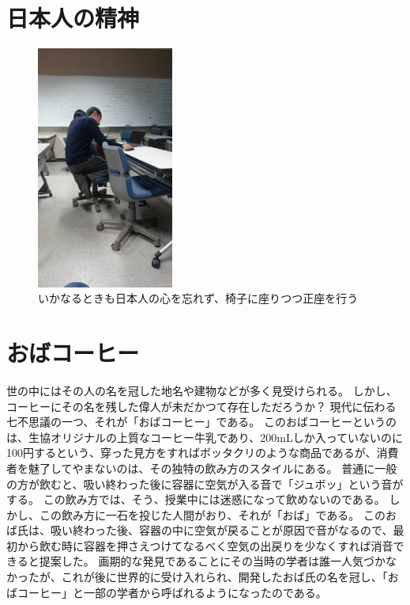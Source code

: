 \section{日本人の精神}

\begin{figure}[h]
\centering
\includegraphics[width=0.4\textwidth]{./section/Shokuji/figures/Seiza.jpg}
  \caption{いかなるときも日本人の心を忘れず、椅子に座りつつ正座を行う}
\label{Fig:Seiza}
\end{figure}



\section{おばコーヒー}
世の中にはその人の名を冠した地名や建物などが多く見受けられる。
しかし、コーヒーにその名を残した偉人が未だかつて存在しただろうか？
現代に伝わる七不思議の一つ、それが「おばコーヒー」である。
このおばコーヒーというのは、生協オリジナルの上質なコーヒー牛乳であり、200mLしか入っていないのに100円するという、穿った見方をすればボッタクリのような商品であるが、消費者を魅了してやまないのは、その独特の飲み方のスタイルにある。
普通に一般の方が飲むと、吸い終わった後に容器に空気が入る音で「ジュボッ」という音がする。
この飲み方では、そう、授業中には迷惑になって飲めないのである。
しかし、この飲み方に一石を投じた人間がおり、それが「おば」である。
このおば氏は、吸い終わった後、容器の中に空気が戻ることが原因で音がなるので、最初から飲む時に容器を押さえつけてなるべく空気の出戻りを少なくすれば消音できると提案した。
画期的な発見であることにその当時の学者は誰一人気づかなかったが、これが後に世界的に受け入れられ、開発したおば氏の名を冠し、「おばコーヒー」と一部の学者から呼ばれるようになったのである。

